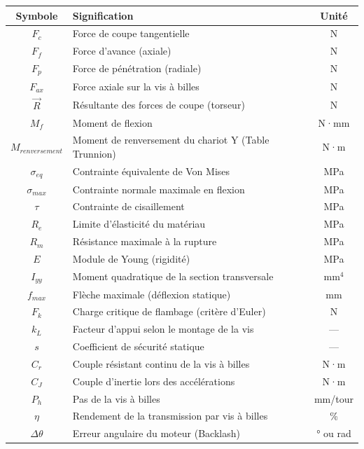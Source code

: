 \vspace{0.3cm}
\renewcommand{\arraystretch}{1.3}
\begin{center}
\begin{tabular}{|c|p{8cm}|c|}
\hline
\rowcolor{macouleur!20}
\textbf{Symbole} & \textbf{Signification} & \textbf{Unité} \\
\hline
$F_c$ & Force de coupe tangentielle & N \\
\hline
$F_f$ & Force d'avance (axiale) & N \\
\hline
$F_p$ & Force de pénétration (radiale) & N \\
\hline
$F_{ax}$ & Force axiale sur la vis à billes & N \\
\hline
$\vec{R}$ & Résultante des forces de coupe (torseur) & N \\
\hline
$M_f$ & Moment de flexion & N·mm \\
\hline
$M_{renversement}$ & Moment de renversement du chariot Y (Table Trunnion) & N·m \\
\hline
$\sigma_{eq}$ & Contrainte équivalente de Von Mises & MPa \\
\hline
$\sigma_{max}$ & Contrainte normale maximale en flexion & MPa \\
\hline
$\tau$ & Contrainte de cisaillement & MPa \\
\hline
$R_e$ & Limite d'élasticité du matériau & MPa \\
\hline
$R_m$ & Résistance maximale à la rupture & MPa \\
\hline
$E$ & Module de Young (rigidité) & MPa \\
\hline
$I_{yy}$ & Moment quadratique de la section transversale & mm$^4$ \\
\hline
$f_{max}$ & Flèche maximale (déflexion statique) & mm \\
\hline
$F_k$ & Charge critique de flambage (critère d'Euler) & N \\
\hline
$k_L$ & Facteur d'appui selon le montage de la vis & --- \\
\hline
$s$ & Coefficient de sécurité statique & --- \\
\hline
$C_r$ & Couple résistant continu de la vis à billes & N·m \\
\hline
$C_J$ & Couple d'inertie lors des accélérations & N·m \\
\hline
$P_h$ & Pas de la vis à billes & mm/tour \\
\hline
$\eta$ & Rendement de la transmission par vis à billes & \% \\
\hline
$\Delta\theta$ & Erreur angulaire du moteur (Backlash) & ° ou rad \\

\end{tabular}
\end{center}
